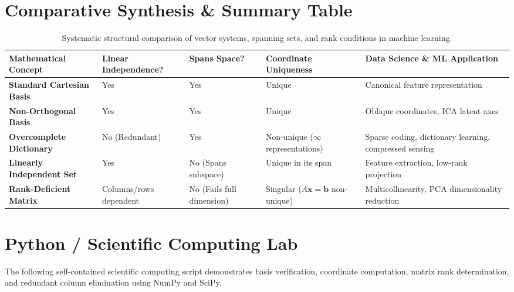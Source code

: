 \section{Comparative Synthesis \& Summary Table}

\begin{table}[htbp]
\centering
\small
\begin{tabular}{p{3.0cm} p{2.2cm} p{2.5cm} p{2.8cm} p{3.2cm}}
\toprule
\textbf{Mathematical Concept} & \textbf{Linear Independence?} & \textbf{Spans Space?} & \textbf{Coordinate Uniqueness} & \textbf{Data Science \& ML Application} \\
\midrule
\textbf{Standard Cartesian Basis} & Yes & Yes & Unique & Canonical feature representation \\
\textbf{Non-Orthogonal Basis} & Yes & Yes & Unique & Oblique coordinates, ICA latent axes \\
\textbf{Overcomplete Dictionary} & No (Redundant) & Yes & Non-unique ($\infty$ representations) & Sparse coding, dictionary learning, compressed sensing \\
\textbf{Linearly Independent Set} & Yes & No (Spans subspace) & Unique in its span & Feature extraction, low-rank projection \\
\textbf{Rank-Deficient Matrix} & Columns/rows dependent & No (Fails full dimension) & Singular ($A\mathbf{x}=\mathbf{b}$ non-unique) & Multicollinearity, PCA dimensionality reduction \\
\bottomrule
\end{tabular}
\caption{Systematic structural comparison of vector systems, spanning sets, and rank conditions in machine learning.}
\label{tab:basis_rank_comparison}
\end{table}

\section{Python / Scientific Computing Lab}

The following self-contained scientific computing script demonstrates basis verification, coordinate computation, matrix rank determination, and redundant column elimination using NumPy and SciPy.

